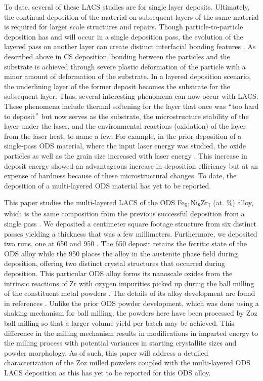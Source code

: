 	To date, several of these LACS studies are for single layer deposits. Ultimately, the continual deposition of the material on subsequent layers of the same material is required for larger scale structures and repairs. Though particle-to-particle deposition has and will occur in a single deposition pass, the evolution of the layered pass on another layer can create distinct interfacial bonding features \cite{RN561,RN147}. As described above in CS deposition, bonding between the particles and the substrate is achieved through severe plastic deformation of the particle with a minor amount of deformation of the substrate. In a layered deposition scenario, the underlining layer of the former deposit becomes the substrate for the subsequent layer. Thus, several interesting phenomena can now occur with LACS. These phenomena include thermal softening for the layer that once was $``$too hard to deposit$"$  but now serves as the substrate, the microstructure stability of the layer under the laser, and the environmental reactions (oxidation) of the layer from the laser heat, to name a few. For example, in the prior deposition of a single-pass ODS material, where the input laser energy was studied, the oxide particles as well as the grain size increased with laser energy \cite{RN383}. This increase in deposit energy showed an advantageous increase in deposition efficiency but at an expense of hardness because of these microstructural changes. To date, the deposition of a multi-layered ODS material has yet to be reported. 



	This paper studies the multi-layered LACS of the ODS Fe\textsubscript{91}Ni\textsubscript{8}Zr\textsubscript{1 }(at. $\%$) alloy, which is the same composition from the previous successful deposition from a single pass \cite{RN383}.  We deposited a centimeter square footage structure from six distinct passes yielding a thickness that was a few millimeters. Furthermore, we deposited two runs, one at 650 \celsius{} and 950 \celsius{}. The 650 \celsius{} deposit retains the ferritic state of the ODS alloy while the 950 \celsius{} places the alloy in the austenite phase field during deposition, offering two distinct crystal structures that occurred during deposition. This particular ODS alloy forms its nanoscale oxides from the intrinsic reactions of Zr with oxygen impurities picked up during the ball milling of the constituent metal powders \cite{RN740}. The details of its alloy development are found in references \cite{RN267,RN740,RN966,RN243,RN550,RN1376,RN291,RN476}. Unlike the prior ODS powder development, which was done using a shaking mechanism for ball milling, the powders here have been processed by Zoz ball milling so that a larger volume yield per batch may be achieved. This difference in the milling mechanism results in modifications in imparted energy to the milling process with potential variances in starting crystallite sizes and powder morphology. As of such, this paper will address a detailed characterization of the Zoz milled powders coupled with the multi-layered ODS LACS deposition as this has yet to be reported for this ODS alloy. 





